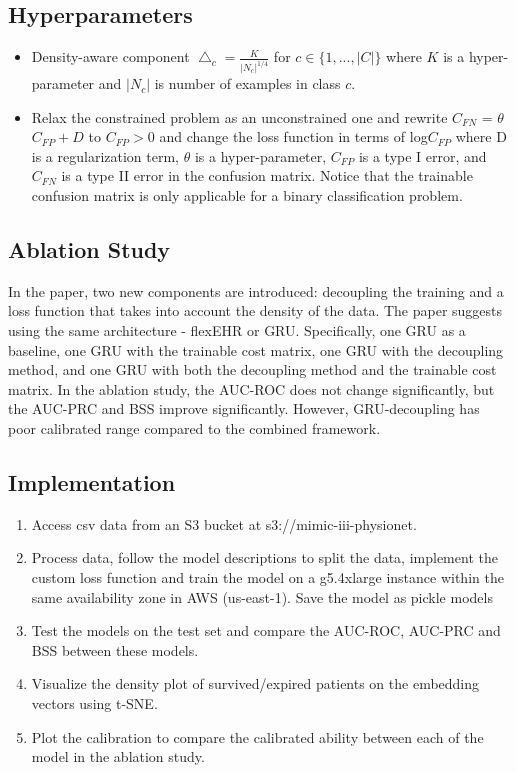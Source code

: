 \documentclass[11pt,a4paper]{article}
\begin{document}
\subsection{Hyperparameters}
\begin{itemize}
\item Density-aware component $\bigtriangleup_c = \frac{K}{|N_c|^{1/4}}$ for $c \in \{1,...,|C|\}$
where $K$ is a hyper-parameter and $|N_c|$ is number of examples in class $c$.

\item Relax the constrained problem as an unconstrained one and rewrite $C_{FN}$ = $\theta$ $C_{FP} + D $ to $C_{FP} > 0$  and change the loss function in terms of log$C_{FP}$ where D is a regularization term, $\theta$ is a hyper-parameter, $C_{FP}$ is a type I error, and $C_{FN}$ is a type II error in the confusion matrix. Notice that the trainable confusion matrix is only applicable for a binary classification problem. 
\end{itemize}

\subsection{Ablation Study}
In the paper, two new components are introduced: decoupling the training and a loss function that takes into account the density of the data. The paper suggests using the same architecture - flexEHR or GRU. Specifically, one GRU as a baseline, one GRU with the trainable cost matrix, one GRU with the decoupling method, and one GRU with both the decoupling method and the trainable cost matrix. In the ablation study, the AUC-ROC does not change significantly, but the AUC-PRC and BSS improve significantly. However, GRU-decoupling has poor calibrated range compared to the combined framework.  

\subsection{Implementation}
 \begin{enumerate}
     \item Access csv data from an S3 bucket at s3://mimic-iii-physionet. 
     \item Process data, follow the model descriptions to split the data, implement the custom loss function and train the model on a g5.4xlarge instance within the same availability zone in AWS (us-east-1). Save the model as pickle models 
     \item Test the models on the test set and compare the AUC-ROC, AUC-PRC and BSS between these models. 
     \item Visualize the density plot of survived/expired patients on the embedding vectors using t-SNE. 
     \item Plot the calibration to compare the calibrated ability between each of the model in the ablation study.  
 \end{enumerate}
\end{document}
